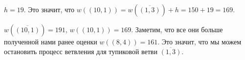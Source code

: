 $h = 19$. Это значит, что $w((10, 1)) = w(\overline{(1, 3)}) + h = 150 + 19 = 169$.

$w(\overline{(10, 1)}) = 191$, $w((10, 1)) = 169$. Заметим, что все они больше полученной нами ранее оценки $w((8, 4)) = 161$. Это значит, что мы можем остановить процесс ветвления для тупиковой ветви $\overline{(1, 3)}$.

\begin{tikzpicture}[
                grow=east, %
                level 1/.style = {level distance=1.70cm}, %
                edge from parent/.style = {draw, -latex},
                kant/.style={text width=2cm, text centered, sloped, font=\scriptsize},
                cell/.style={circle, draw, align=center, font=\scriptsize}, %
        ]


\end{tikzpicture}
